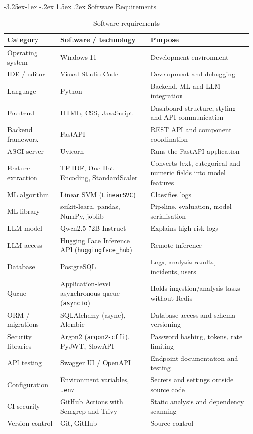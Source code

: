 \documentclass[12pt,a4paper]{report}
\makeatletter
\renewcommand{\arraystretch}{1.05}
\renewcommand\subsection{\@startsection{subsection}{2}{\z@}%
  {-3.25ex\@plus -1ex \@minus -.2ex}%
  {1.5ex \@plus .2ex}%
  {\normalfont\fontsize{12}{18}\selectfont\bfseries}}
\makeatother
\begin{document}
\subsection{Software Requirements}
\begin{table}[H]
\centering
\caption{Software requirements}
\label{tab:sw}
\small
\renewcommand{\arraystretch}{1.0}
\begin{tabularx}{\textwidth}{>{\raggedright\arraybackslash}p{3.4cm} >{\raggedright\arraybackslash}p{4.2cm} >{\raggedright\arraybackslash}X}
\toprule
\textbf{Category} & \textbf{Software / technology} & \textbf{Purpose}\\
\midrule
Operating system & Windows 11 & Development environment\\
IDE / editor & Visual Studio Code & Development and debugging\\
Language & Python & Backend, ML and LLM integration\\
Frontend & HTML, CSS, JavaScript & Dashboard structure, styling and API communication\\
Backend framework & FastAPI & REST API and component coordination\\
ASGI server & Uvicorn & Runs the FastAPI application\\
Feature extraction & TF-IDF, One-Hot Encoding, StandardScaler & Converts text, categorical and numeric fields into model features\\
ML algorithm & Linear SVM (\texttt{LinearSVC}) & Classifies logs\\
ML library & scikit-learn, pandas, NumPy, joblib & Pipeline, evaluation, model serialisation\\
LLM model & Qwen2.5-72B-Instruct & Explains high-risk logs\\
LLM access & Hugging Face Inference API (\texttt{huggingface\_hub}) & Remote inference\\
Database & PostgreSQL & Logs, analysis results, incidents, users\\
Queue & Application-level asynchronous queue (\texttt{asyncio}) & Holds ingestion/analysis tasks without Redis\\
ORM / migrations & SQLAlchemy (async), Alembic & Database access and schema versioning\\
Security libraries & Argon2 (\texttt{argon2-cffi}), PyJWT, SlowAPI & Password hashing, tokens, rate limiting\\
API testing & Swagger UI / OpenAPI & Endpoint documentation and testing\\
Configuration & Environment variables, \texttt{.env} & Secrets and settings outside source code\\
CI security & GitHub Actions with Semgrep and Trivy & Static analysis and dependency scanning\\
Version control & Git, GitHub & Source control\\
\bottomrule
\end{tabularx}
\end{table}
\end{document}
